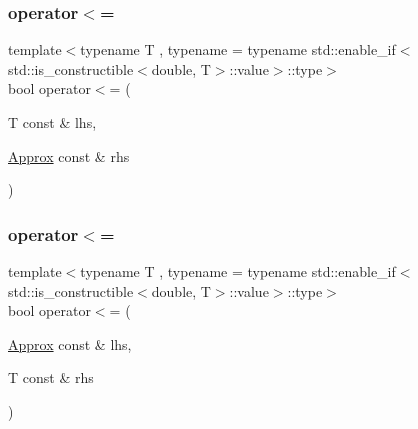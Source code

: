 \subsubsection{\texorpdfstring{operator$<$=}{operator<=}\hspace{0.1cm}{\footnotesize\ttfamily [1/2]}}
{\footnotesize\ttfamily template$<$typename T , typename  = typename std\+::enable\+\_\+if$<$std\+::is\+\_\+constructible$<$double, T$>$\+::value$>$\+::type$>$ \\
bool operator$<$= (\begin{DoxyParamCaption}\item[{T const \&}]{lhs,  }\item[{\mbox{\hyperlink{class_catch_1_1_detail_1_1_approx}{Approx}} const \&}]{rhs }\end{DoxyParamCaption})\hspace{0.3cm}{\ttfamily [friend]}}

\mbox{\label{class_catch_1_1_detail_1_1_approx_a6040b908588745570847d7ae8483b091}} 
\subsubsection{\texorpdfstring{operator$<$=}{operator<=}\hspace{0.1cm}{\footnotesize\ttfamily [2/2]}}
{\footnotesize\ttfamily template$<$typename T , typename  = typename std\+::enable\+\_\+if$<$std\+::is\+\_\+constructible$<$double, T$>$\+::value$>$\+::type$>$ \\
bool operator$<$= (\begin{DoxyParamCaption}\item[{\mbox{\hyperlink{class_catch_1_1_detail_1_1_approx}{Approx}} const \&}]{lhs,  }\item[{T const \&}]{rhs }\end{DoxyParamCaption})\hspace{0.3cm}{\ttfamily [friend]}}

\mbox{\label{class_catch_1_1_detail_1_1_approx_ab38782a37d09b527ca5e126dbf433dda}} 

